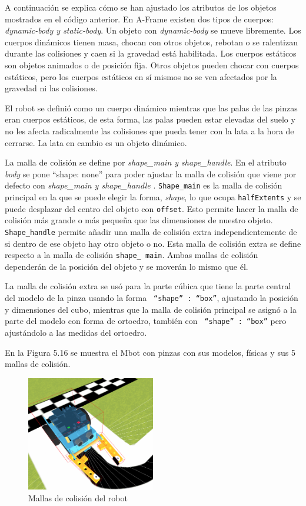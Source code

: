 A continuación se explica cómo se han ajustado los atributos de los objetos mostrados en el código anterior. En A-Frame existen dos tipos de cuerpos: \textit{dynamic-body y static-body}. Un objeto con \textit{dynamic-body}  se mueve libremente. Los cuerpos dinámicos tienen masa, chocan con otros objetos, rebotan o se ralentizan durante las colisiones y caen si la gravedad está habilitada.
Los cuerpos estáticos son objetos animados o de posición fija. Otros objetos pueden chocar con cuerpos estáticos, pero los cuerpos estáticos en sí mismos no se ven afectados por la gravedad ni las colisiones.

El robot se definió como un cuerpo dinámico mientras que las palas de las pinzas eran cuerpos estáticos, de esta forma, las palas pueden estar elevadas del suelo y no les afecta  radicalmente las colisiones que pueda tener con la lata a la hora de cerrarse. La lata en cambio es un objeto dinámico.

La malla de colisión se define por \textit{shape\_main y shape\_handle}. En el atributo \textit{body} se pone ``shape: none'' para poder ajustar la malla de colisión que viene por defecto con \textit{shape\_main y shape\_handle} .
\texttt{Shape\_main} es la malla de colisión principal en la que se puede elegir la forma, \textit{shape}, lo que ocupa \texttt{halfExtents} y se puede desplazar del centro del objeto con \texttt{offset}. Esto permite hacer la malla de colisión más grande o más pequeña que las dimensiones de nuestro objeto. \texttt{ Shape\_handle} permite añadir una malla de colisión extra independientemente de si dentro de ese  objeto hay otro objeto o no. Esta malla de colisión extra se define respecto a la malla de colisión \texttt{shape\_ main}. Ambas mallas de colisión dependerán de la posición del objeto y se moverán lo mismo que él.

La malla de colisión extra se usó para la parte cúbica que tiene la parte central del modelo de la pinza usando la forma  \texttt{ ``shape'' : ``box''},  ajustando  la posición y dimensiones del cubo, mientras que la malla de colisión principal se asignó a la parte del modelo con forma de ortoedro, también con \texttt{ ``shape'' : ``box''} pero ajustándolo a las medidas del ortoedro.

En la Figura  5.16 se muestra el Mbot con pinzas con sus modelos, físicas y sus 5 mallas de colisión.

 \begin{figure}[H]
  \centering
 \includegraphics[width=0.5\textwidth, height=0.4\textwidth]{chapters/images/mallas.png}
  \caption{Mallas de colisión del robot}
\end{figure}

